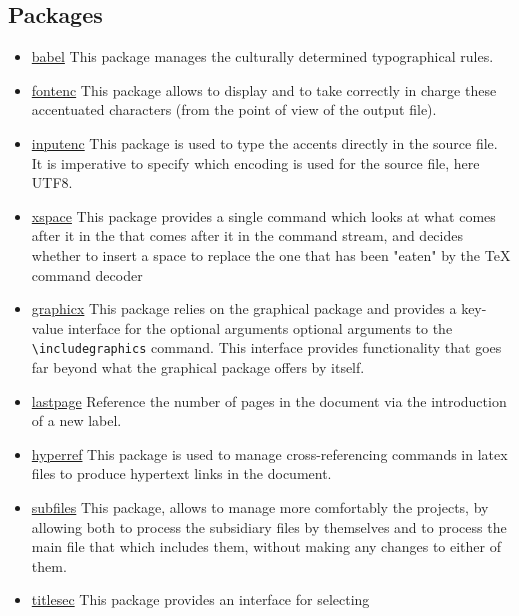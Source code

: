 \subsection{Packages}

\begin{itemize}
    \item \href{https://www.ctan.org/pkg/babel}{babel} This package manages the culturally
          determined typographical rules.
    \item \href{https://ctan.org/pkg/fontenc}{fontenc} This package allows to display and
          to take correctly in charge these accentuated characters (from the point of view of the output file).
    \item \href{https://www.ctan.org/pkg/inputenc}{inputenc} This package is used to type the accents
          directly in the source file. It is imperative to specify which encoding is used for the
          source file, here UTF8.
    \item \href{https://www.ctan.org/pkg/inputenc}{xspace} This package provides a single command which looks at what comes after it in the
          that comes after it in the command stream, and decides whether to insert a space to replace
          the one that has been "eaten" by the TeX command decoder
    \item \href{https://www.ctan.org/pkg/graphicx}{graphicx} This package relies on
          the graphical package and provides a key-value interface for the optional arguments
          optional arguments to the \verb=\includegraphics= command. This interface provides
          functionality that goes far beyond what the graphical package offers by itself.
    \item \href{https://www.ctan.org/pkg/lastpage}{lastpage} Reference the number of pages in the
          document via the introduction of a new label.
    \item \href{https://www.ctan.org/pkg/hyperref}{hyperref} This package is used
          to manage cross-referencing commands in \gls{latex} files to produce hypertext links in the document.
    \item \href{https://www.ctan.org/pkg/subfiles}{subfiles} This package, allows to manage more comfortably the projects,
          by allowing both to process the subsidiary files by themselves and to process the main file that
          which includes them, without making any changes to either of them.
    \item \href{https://www.ctan.org/pkg/titlesec}{titlesec} This package provides an interface for selecting

\end{itemize}
